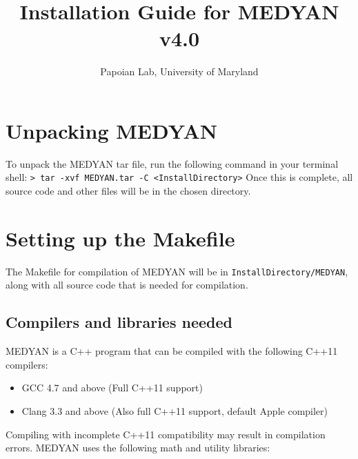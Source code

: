 \documentclass[11pt, oneside]{article}   	%
\title{Installation Guide for MEDYAN \textbf{v4.0}}
\author{Papoian Lab, University of Maryland}
\date{}							%
\begin{document}
\maketitle

\tableofcontents
\newpage

\section{Unpacking MEDYAN}
 
 To unpack the MEDYAN tar file, run the following command in your terminal shell: \newline \newline \indent\texttt{> tar -xvf MEDYAN.tar -C <InstallDirectory>} \newline \newline Once this is complete, all source code and other files will be in the chosen directory.
 
 
\section{Setting up the Makefile}

The Makefile for compilation of MEDYAN will be in \texttt{InstallDirectory/MEDYAN}, along with all source code that is needed for compilation.

\subsection {Compilers and libraries needed}

MEDYAN is a C++ program that can be compiled with the following C++11 compilers:

\begin{itemize}
\item GCC 4.7 and above (Full C++11 support)
\item  Clang 3.3 and above (Also full C++11 support, default Apple compiler)
\end{itemize}  

\noindent Compiling with incomplete C++11 compatibility may result in compilation errors. \newline MEDYAN uses the following math and utility libraries:
\end{document}
